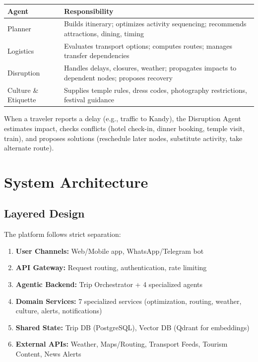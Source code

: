 \documentclass[11pt]{article}
\begin{document}
\begin{table}[h]\centering\small
\begin{tabular}{|l|p{3.5in}|}
\hline
\textbf{Agent} & \textbf{Responsibility} \\
\hline
Planner & Builds itinerary; optimizes activity sequencing; recommends attractions, dining, timing \\
\hline
Logistics & Evaluates transport options; computes routes; manages transfer dependencies \\
\hline
Disruption & Handles delays, closures, weather; propagates impacts to dependent nodes; proposes recovery \\
\hline
Culture \& Etiquette & Supplies temple rules, dress codes, photography restrictions, festival guidance \\
\hline
\end{tabular}
\end{table}

When a traveler reports a delay (e.g., traffic to Kandy), the Disruption Agent estimates impact, checks conflicts (hotel check-in, dinner booking, temple visit, train), and proposes solutions (reschedule later nodes, substitute activity, take alternate route).

\section{System Architecture}

\subsection{Layered Design}

The platform follows strict separation:

\begin{enumerate}
    \item \textbf{User Channels:} Web/Mobile app, WhatsApp/Telegram bot
    \item \textbf{API Gateway:} Request routing, authentication, rate limiting
    \item \textbf{Agentic Backend:} Trip Orchestrator + 4 specialized agents
    \item \textbf{Domain Services:} 7 specialized services (optimization, routing, weather, culture, alerts, notifications)
    \item \textbf{Shared State:} Trip DB (PostgreSQL), Vector DB (Qdrant for embeddings)
    \item \textbf{External APIs:} Weather, Maps/Routing, Transport Feeds, Tourism Content, News Alerts
\end{enumerate}
\end{document}
